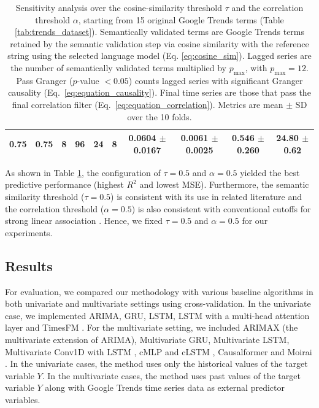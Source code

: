 \documentclass[acmsmall]{acmart}
\begin{document}
\begin{table}[H]
{\begin{tabular}{cccccccccc}
0.75 & 0.75 & 8 & 96 & 24 & 8 & 0.0604 $\pm$ 0.0167 & 0.0061 $\pm$ 0.0025 & 0.546 $\pm$ 0.260 & \textbf{24.80} $\pm$ 0.62 \\
\bottomrule
\end{tabular}%
}
\caption{{\color{black}Sensitivity analysis over the cosine-similarity threshold $\tau$ and the correlation threshold $\alpha$, starting from 15 original Google Trends terms (Table \ref{tab:trends_dataset}). Semantically validated terms are Google Trends terms retained by the semantic validation step via cosine similarity with the reference string using the selected language model (Eq. \ref{eq:cosine_sim}). Lagged series are the number of semantically validated terms multiplied by $p_{\max}$, with $p_{\max}=12$. Pass Granger ($p$-value $<0.05$) counts lagged series with significant Granger causality (Eq.~\ref{eq:equation_causality}). Final time series are those that pass the final correlation filter (Eq.~\ref{eq:equation_correlation}). Metrics are mean $\pm$ SD over the 10 folds.}}
\label{tab:sensitivity_tau_alpha_final}
\end{table}
{\color{black} As shown in Table \ref{tab:sensitivity_tau_alpha_final}, the configuration of $\tau=0.5$ and $\alpha=0.5$ yielded the best predictive performance (highest $R^2$ and lowest MSE). Furthermore, the semantic similarity threshold ($\tau=0.5$) is consistent with its use in related literature \cite{leung2022semantic} and the correlation threshold ($\alpha=0.5$) is also consistent with conventional cutoffs for strong linear association \cite{adler2010quantifying}. Hence, we fixed $\tau=0.5$ and $\alpha=0.5$ for our experiments.
}

\subsection{Results} \label{sec:results}
For evaluation, we compared our methodology with various baseline algorithms in both univariate and multivariate settings using cross-validation. In the univariate case, we implemented ARIMA, GRU, LSTM, LSTM with a multi-head attention layer {\color{black}and TimesFM \cite{das2024decoder}}. For the multivariate setting, we included ARIMAX (the multivariate extension of ARIMA), Multivariate GRU, Multivariate LSTM, Multivariate Conv1D with LSTM \cite{long2021air}, cMLP and cLSTM \cite{tank2021neural}, Causalformer \cite{kong2024causalformer} {\color{black}and Moirai \cite{woo2024unified}}. In the univariate cases, the method uses only the historical values of the target variable $Y$. In the multivariate cases, the method uses past values of the target variable $Y$ along with Google Trends time series data as external predictor variables.
\end{document}
